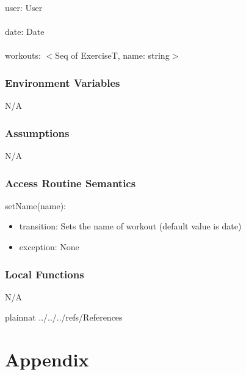 \documentclass[12pt, titlepage]{article}
\begin{document}
user: User\\\\
date: Date\\\\
workouts: $<$Seq of ExerciseT, name: string$>$

\subsubsection{Environment Variables}

N/A

\subsubsection{Assumptions}

N/A

\subsubsection{Access Routine Semantics}

\noindent setName(name):
\begin{itemize}
	\item transition: Sets the name of workout (default value is date)
	\item exception: None
\end{itemize}

\subsubsection{Local Functions}

N/A

\newpage



 {plainnat}
 {../../../refs/References}

\newpage

\section{Appendix} \label{Appendix}

\end{document}
